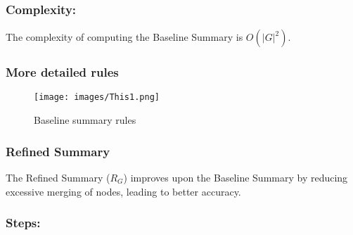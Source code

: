 \documentclass[article,submit,pdftex,moreauthors]{Definitions/mdpi}
\begin{document}
\subsubsection*{Complexity:}
The complexity of computing the Baseline Summary is $O(|G|^2)$.

\subsubsection*{More detailed rules}

\begin{figure}[H]
    \centering
    \texttt{[image: images/This1.png]}
    \caption{Baseline summary rules}
    \label{fig:summaryRules}
\end{figure}

\subsubsection{\textbf{Refined Summary}}

The Refined Summary ($R_G$) improves upon the Baseline Summary by reducing excessive merging of nodes, leading to better accuracy.

\subsubsection*{Steps:}
\end{document}
